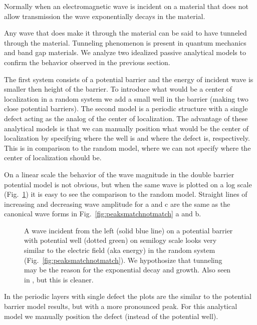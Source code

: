 Normally when an electromagnetic wave is incident on a
material that does not allow transmission the wave
exponentially decays in the material.

Any wave that does make it through the material can be
said to have tunneled through the material.  Tunneling phenomenon
is present in quantum mechanics and band gap materials.
We analyze two idealized passive analytical models to confirm 
the behavior observed in the previous section. 

The first system consists of a potential barrier 
and the energy of incident wave is smaller then height of the barrier.
To introduce what would be a center of localization in
a random system we add a small well in the barrier (making
two close potential barriers).
The second model is a periodic structure with a single
defect acting as the analog of the center of localization.
The advantage of these analytical models is that we can
manually position what would be the center of localization
by specifying where the well is and where the defect
is, respectively. This is in comparison to the random model,
where we can not specify where the center of localization should be.

On a linear scale the behavior of the wave magnitude 
in the double barrier potential model is not
obvious, but when the same wave is plotted on a log
scale (Fig.~\ref{fig:barrierdefectlog}) it is
easy to see the comparison to the
random model.  Straight lines of increasing and
decreasing wave amplitude for a and c are the same as the canonical
wave forms in Fig.~\ref{fig:peaksmatchnotmatch} a and b.

\begin{figure}
\vskip -0.5cm
\centerline{
}
\vskip -0.5cm
\caption{A wave incident from the left (solid blue line) on
a potential barrier with potential well (dotted green) on semilogy scale looks 
very similar to the electric field (aka
energy) in the random system (Fig.~\ref{fig:peaksmatchnotmatch}).
We hypothosize that tunneling may be the reason for the
exponential decay and growth. Also seen in 
\cite{2004_Bliokh_wavelet}, but this is cleaner.}
\label{fig:barrierdefectlog}
\end{figure}

In the periodic layers with single defect the plots are the similar to the potential barrier model results, but with a more pronounced peak. For this analytical model we manually position the defect (instead of the potential well).

